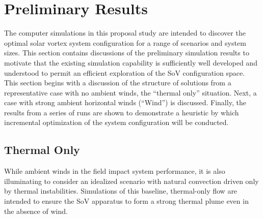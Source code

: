 
\section{Preliminary Results}
\label{sec:results}

%
%
%
%

The computer simulations in this proposal study are intended to discover
the optimal solar vortex system configuration for a range of scenarios
and system sizes. 
This section contains discussions of the preliminary simulation results 
to motivate that the existing simulation capability is sufficiently well
developed and understood to permit an efficient exploration of the SoV
configuration space. 
This section begins with a discussion of the structure of solutions from
a representative case with no ambient winds, the ``thermal only''
situation. Next, a case with strong ambient horizontal winds (``Wind'')
is discussed. Finally, the results from a series of runs are shown to
demonstrate a heuristic by which incremental optimization of the system
configuration will be conducted. 



\subsection{Thermal Only}

While ambient winds in the field impact system performance, it is
also illuminating to consider an idealized scenario with natural convection
driven only by thermal instabilities. Simulations of this baseline,
thermal-only flow are intended to ensure the SoV apparatus to form a
strong thermal plume even in the absence of wind. 

